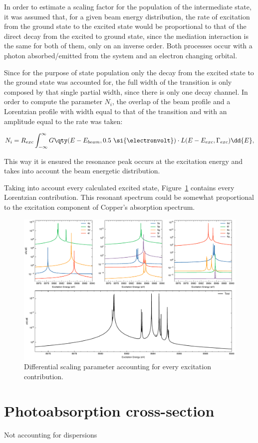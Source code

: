 In order to estimate a scaling factor for the population of the intermediate state, it was assumed that, for a given beam energy distribution, the rate of excitation from the ground state to the excited state would be proportional to that of the direct decay from the excited to ground state, since the mediation interaction is the same for both of them, only on an inverse order. Both processes occur with a photon absorbed/emitted  from the system and an electron changing orbital.

Since for the purpose of  state population only the decay from the excited state to the ground state was accounted for, the full width of the transition is only composed by that single partial width, since there is only one decay channel. In order to compute the parameter $N_i$, the overlap of the beam profile and a Lorentzian profile with width equal to that of the transition and with an amplitude equal to the rate was taken:

\begin{equation}
    N_i =R_{exc} \int_{-\infty}^\infty G\qty(E-E_{beam},0.5\ \si{\electronvolt})\cdot L(E-E_{exc},\Gamma_{exc}) \dd{E},
\end{equation}

This way it is ensured the resonance peak occurs at the excitation energy and takes into account the beam energetic distribution.

Taking into account every calculated excited state, Figure~\ref{fig:absorption} contains every Lorentzian contribution. This resonant spectrum could be somewhat proportional to the excitation component of Copper's absorption spectrum. 


\begin{figure}[h!]
    \centering
    \includegraphics[width=\linewidth]{Chapters/Figures/Chapter4/absorption.pdf}
    \caption{Differential scaling parameter accounting for every excitation contribution.}\label{fig:absorption}
\end{figure}





\section{Photoabsorption cross-section}
Not accounting for dispersions